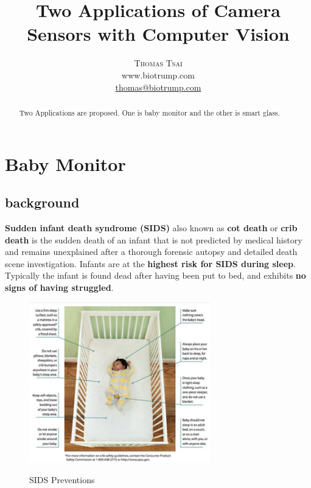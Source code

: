 \documentclass[a4paper,10pt]{report}
\title{\vspace{-15mm}\fontsize{24pt}{10pt}\selectfont\textbf{Two Applications of Camera Sensors with Computer Vision}} %
\author{
\large
\textsc{Thomas Tsai}\\[2mm] %
\normalsize www.biotrump.com \\ %
\normalsize \href{mailto:thomas@biotrump.com}{thomas@biotrump.com} %
\vspace{-5mm}
}
\date{}
\begin{document}
\maketitle

\begin{abstract}
Two Applications are proposed. One is baby monitor and the other is smart glass.

\end{abstract}

\chapter{Baby Monitor}
\section {background}
\textbf{Sudden infant death syndrome (SIDS)} also known as \textbf{cot death} or
\textbf{crib death} is the sudden death of an infant that is not predicted by 
medical history and remains unexplained after a thorough forensic autopsy and 
detailed death scene investigation. Infants are at the \textbf{highest risk for 
SIDS during sleep}. Typically the infant is found dead after having been put 
to bed, and exhibits \textbf{no signs of having struggled}.\cite{wiki-SIDS}\\

\begin{figure}[h]
  \centering
	\includegraphics[width=0.7\textwidth, keepaspectratio=true]{baby-sids-prevention}
  \caption{SIDS Preventions}\cite{SIDS-healthystartorange}
  \label{fig:sids}
\end{figure}
\end{document}
